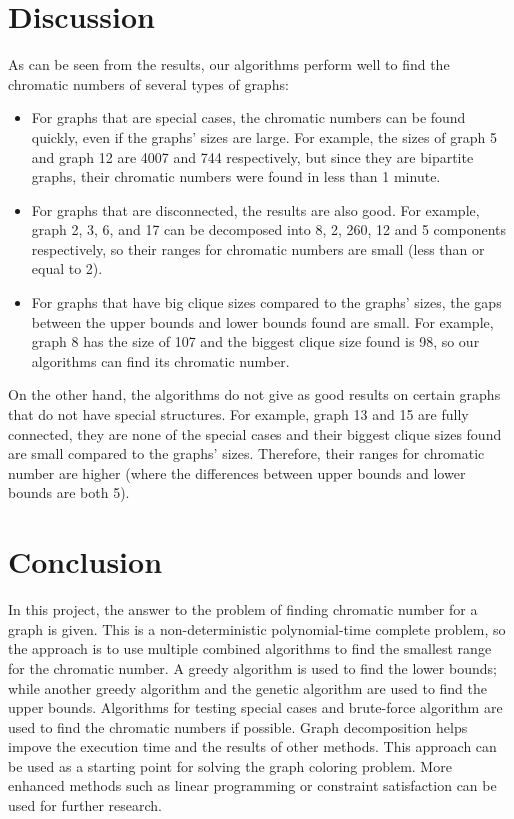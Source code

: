 \documentclass[a4paper]{report}
\begin{document}
	\chapter{Discussion}
	As can be seen from the results, our algorithms perform well to find the chromatic numbers of several types of graphs:
	\begin{itemize}
		\item For graphs that are special cases, the chromatic numbers can be found quickly, even if the graphs' sizes are large. For example, the sizes of graph 5 and graph 12 are 4007 and 744 respectively, but since they are bipartite graphs, their chromatic numbers were found in less than 1 minute.
		\item For graphs that are disconnected, the results are also good. For example, graph 2, 3, 6, and 17 can be decomposed into 8, 2, 260, 12 and 5 components respectively, so their ranges for chromatic numbers are small (less than or equal to 2).
		\item For graphs that have big clique sizes compared to the graphs' sizes, the gaps between the upper bounds and lower bounds found are small. For example, graph 8 has the size of 107 and the biggest clique size found is 98, so our algorithms can find its chromatic number.
	\end{itemize}
	On the other hand, the algorithms do not give as good results on certain graphs that do not have special structures. For example, graph 13 and 15 are fully connected, they are none of the special cases and their biggest clique sizes found are small compared to the graphs' sizes. Therefore, their ranges for chromatic number are higher (where the differences between upper bounds and lower bounds are both 5).
	
	\chapter{Conclusion}
	In this project, the answer to the problem of finding chromatic number for a graph is given. This is a non-deterministic polynomial-time complete problem, so the approach is to use multiple combined algorithms to find the smallest range for the chromatic number. A greedy algorithm is used to find the lower bounds; while another greedy algorithm and the genetic algorithm are used to find the upper bounds. Algorithms for testing special cases and brute-force algorithm are used to find the chromatic numbers if possible. Graph decomposition helps impove the execution time and the results of other methods. This approach can be used as a starting point for solving the graph coloring problem. More enhanced methods such as linear programming or constraint satisfaction can be used for further research.
	
	
	
	
\end{document}
